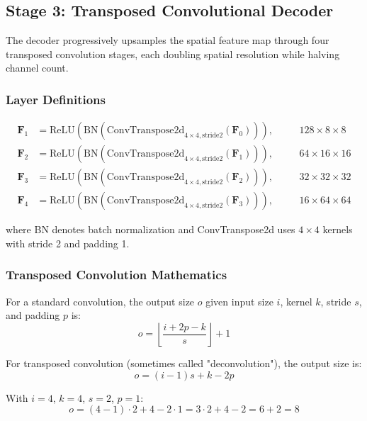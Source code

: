 ﻿\documentclass[12pt,a4paper,oneside]{report}
\begin{document}
\subsection{Stage 3: Transposed Convolutional Decoder}

The decoder progressively upsamples the spatial feature map through four transposed convolution stages, each doubling spatial resolution while halving channel count.

\subsubsection{Layer Definitions}

\begin{align}
\mathbf{F}_1 &= \text{ReLU}(\text{BN}(\text{ConvTranspose2d}_{4\times4,\text{stride}2}(\mathbf{F}_0))), &\quad &128 \times 8 \times 8 \\
\mathbf{F}_2 &= \text{ReLU}(\text{BN}(\text{ConvTranspose2d}_{4\times4,\text{stride}2}(\mathbf{F}_1))), &\quad &64 \times 16 \times 16 \\
\mathbf{F}_3 &= \text{ReLU}(\text{BN}(\text{ConvTranspose2d}_{4\times4,\text{stride}2}(\mathbf{F}_2))), &\quad &32 \times 32 \times 32 \\
\mathbf{F}_4 &= \text{ReLU}(\text{BN}(\text{ConvTranspose2d}_{4\times4,\text{stride}2}(\mathbf{F}_3))), &\quad &16 \times 64 \times 64
\end{align}

where BN denotes batch normalization and ConvTranspose2d uses $4 \times 4$ kernels with stride 2 and padding 1.

\subsubsection{Transposed Convolution Mathematics}

For a standard convolution, the output size $o$ given input size $i$, kernel $k$, stride $s$, and padding $p$ is:
\begin{equation}
o = \left\lfloor \frac{i + 2p - k}{s} \right\rfloor + 1
\end{equation}

For transposed convolution (sometimes called "deconvolution"), the output size is:
\begin{equation}
o = (i - 1)s + k - 2p
\end{equation}

With $i=4$, $k=4$, $s=2$, $p=1$:
\begin{equation}
o = (4 - 1)\cdot 2 + 4 - 2\cdot 1 = 3\cdot 2 + 4 - 2 = 6 + 2 = 8
\end{equation}
\end{document}
